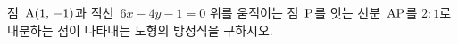 점~$\mathrm{A}(1,\mkern3mu -1)$과 직선~$6x-4y-1=0$ 위를 움직이는 점~$\mathrm{P}$를 잇는 선분~$\mathrm{AP}$를 $2:1$로 내분하는 점이 나타내는 도형의 방정식을 구하시오.
